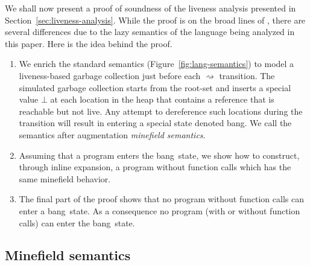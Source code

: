 \documentclass[preprint,9pt]{sigplanconf}
\newcommand{\bang}{\mbox{\sc bang}}
\begin{document}
We shall now  present a proof of soundness of  the liveness analysis
presented in Section~\ref{sec:liveness-analysis}.   While the proof is
on the broad lines of \cite{asati14lgc}, there are several differences
due to  the lazy  semantics of  the language  being 
analyzed in this paper. Here is the idea behind the proof.
\begin{enumerate}
\item       We        enrich       the        standard       semantics
  (Figure~\ref{fig:lang-semantics}) to model  a liveness-based garbage
  collection  just  before  each  $\rightsquigarrow$  transition.  The
  simulated garbage collection starts from  the root-set and inserts a
  special value  $\bot$ at each location  in the heap that  contains a
  reference that is reachable but not live. Any attempt to dereference
  such  locations during  the  transition will  result  in entering  a
  special state denoted \bang. We call the semantics after
  augmentation  \emph{minefield semantics}.
\item \label{inline2} Assuming that a  program enters the \bang\ state,
  we  show  how to  construct,  through  inline expansion,  a  program
  without function calls which has the same minefield behavior.
\item  The final  part  of the  proof shows  that  no program  without
  function calls can enter a \bang\ state. As a consequence no program
  (with or without function calls) can enter the \bang\ state. 
\end{enumerate}

\subsection{Minefield semantics}
\end{document}
